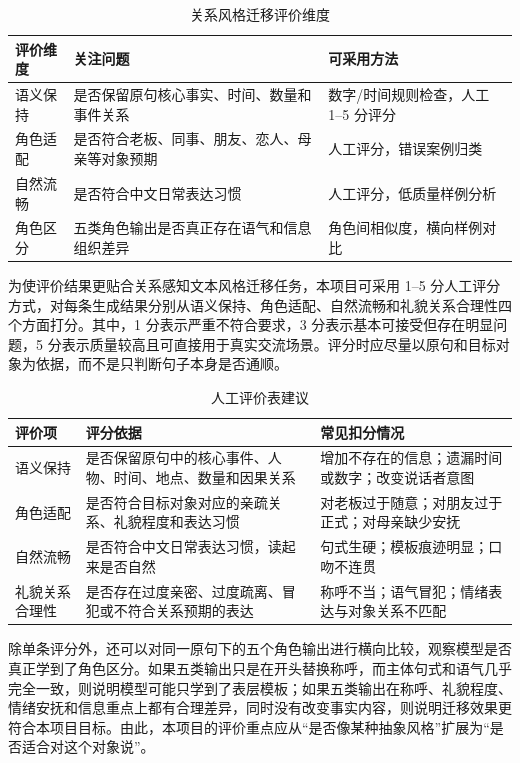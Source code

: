 \documentclass[12pt,a4paper]{ctexart}
\begin{document}
\begin{table}[H]
\centering
\caption{关系风格迁移评价维度}
\label{tab:evaluation_dimensions}
\begin{tabular}{p{3cm}|p{4.4cm}|p{5cm}}
\toprule
评价维度 & 关注问题 & 可采用方法 \\
\midrule
语义保持 & 是否保留原句核心事实、时间、数量和事件关系 & 数字/时间规则检查，人工 1--5 分评分 \\
角色适配 & 是否符合老板、同事、朋友、恋人、母亲等对象预期 & 人工评分，错误案例归类 \\
自然流畅 & 是否符合中文日常表达习惯 & 人工评分，低质量样例分析 \\
角色区分 & 五类角色输出是否真正存在语气和信息组织差异 & 角色间相似度，横向样例对比 \\
\bottomrule
\end{tabular}
\end{table}

为使评价结果更贴合关系感知文本风格迁移任务，本项目可采用 1--5 分人工评分方式，对每条生成结果分别从语义保持、角色适配、自然流畅和礼貌关系合理性四个方面打分。其中，1 分表示严重不符合要求，3 分表示基本可接受但存在明显问题，5 分表示质量较高且可直接用于真实交流场景。评分时应尽量以原句和目标对象为依据，而不是只判断句子本身是否通顺。

\begin{table}[H]
\centering
\caption{人工评价表建议}
\label{tab:human_evaluation_form}
\begin{tabular}{p{2.8cm}|p{6.2cm}|p{4.2cm}}
\toprule
评价项 & 评分依据 & 常见扣分情况 \\
\midrule
语义保持 & 是否保留原句中的核心事件、人物、时间、地点、数量和因果关系 & 增加不存在的信息；遗漏时间或数字；改变说话者意图 \\
角色适配 & 是否符合目标对象对应的亲疏关系、礼貌程度和表达习惯 & 对老板过于随意；对朋友过于正式；对母亲缺少安抚 \\
自然流畅 & 是否符合中文日常表达习惯，读起来是否自然 & 句式生硬；模板痕迹明显；口吻不连贯 \\
礼貌关系合理性 & 是否存在过度亲密、过度疏离、冒犯或不符合关系预期的表达 & 称呼不当；语气冒犯；情绪表达与对象关系不匹配 \\
\bottomrule
\end{tabular}
\end{table}

除单条评分外，还可以对同一原句下的五个角色输出进行横向比较，观察模型是否真正学到了角色区分。如果五类输出只是在开头替换称呼，而主体句式和语气几乎完全一致，则说明模型可能只学到了表层模板；如果五类输出在称呼、礼貌程度、情绪安抚和信息重点上都有合理差异，同时没有改变事实内容，则说明迁移效果更符合本项目目标。由此，本项目的评价重点应从“是否像某种抽象风格”扩展为“是否适合对这个对象说”。
\end{document}
